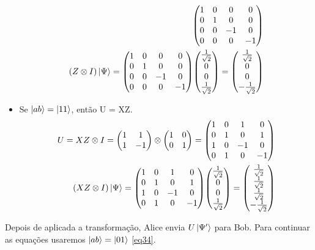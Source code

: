 \documentclass[a4paper, 12pt, oneside]{book}
\begin{document}
\begin{itemize}
\begin{align}
	\mqty(1&0&0&0\\0&1&0&0\\0&0&-1&0\\0&0&0&-1) \\
(Z\otimes I)\ket{\Psi} =  \mqty(1&0&0&0\\0&1&0&0\\0&0&-1&0\\0&0&0&-1) 
	\mqty(\frac{1}{\sqrt{2}}\\0\\ 0\\ \frac{1}{\sqrt{2}}) 
	= \mqty(\frac{1}{\sqrt{2}}\\0\\ 0\\ -\frac{1}{\sqrt{2}}) 
\end{align}
\item Se $\ket{ab}=\ket{11}$, então U = XZ.
\begin{align}
U = XZ\otimes I = \mqty(1&1\\1&-1)\otimes\mqty(1&0\\0&1) = 
	\mqty(1&0&1&0\\0&1&0&1\\1&0&-1&0\\0&1&0&-1) \\
(XZ\otimes I)\ket{\Psi} =  \mqty(1&0&1&0\\0&1&0&1\\1&0&-1&0\\0&1&0&-1)
	\mqty(\frac{1}{\sqrt{2}}\\0\\ 0\\ \frac{1}{\sqrt{2}}) 
	= \mqty(\frac{1}{\sqrt{2}}\\ \frac{1}{\sqrt{2}}\\ \frac{1}{\sqrt{2}}\\ -\frac{1}{\sqrt{2}}) 
\end{align}
\end{itemize}
Depois de aplicada a transformação, Alice envia $U\ket{\Psi'}$ para Bob. Para continuar as equações usaremos $\ket{ab}=\ket{01}$ \eqref{eq34}.
\end{document}

